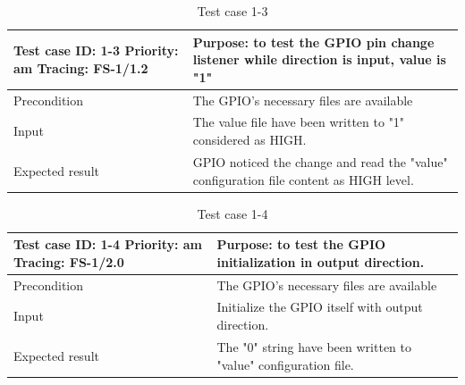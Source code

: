 \begin{table}[H]
	\caption{Test case 1-3}
	\label{table:TCase-FS1-3}
	\begin{center}
		\renewcommand{\arraystretch}{1.8}
		\begin{tabu} 
			to 0.9 \textwidth
			{  X[0.4, c] X[c] }
			\toprule
			Test case ID: 1-3 \newline Priority: am \newline Tracing: FS-1/1.2 & Purpose: to test the GPIO pin change listener while direction is input, value is "1"   \\ \midrule
			Precondition                                                       & The GPIO's necessary files are available                                               \\
			Input                                                              & The value file have been written to "1" considered as HIGH.                            \\
			Expected result                                                    & GPIO noticed the change and read the "value" configuration file content as HIGH level. \\ \bottomrule
		\end{tabu}
	\end{center}
\end{table} 

\begin{table}[H]
	\caption{Test case 1-4}
	\label{table:TCase-FS1-4}
	\begin{center}
		\renewcommand{\arraystretch}{1.8}
		\begin{tabu} 
			to 0.9 \textwidth
			{  X[0.4, c] X[c] }
			\toprule
			Test case ID: 1-4 \newline Priority: am \newline Tracing: FS-1/2.0 & Purpose: to test the GPIO initialization in output direction.   \\ \midrule
			Precondition                                                       & The GPIO's necessary files are available                        \\
			Input                                                              & Initialize the GPIO itself with output direction.               \\
			Expected result                                                    & The "0" string have been written to "value" configuration file. \\ \bottomrule
		\end{tabu}
	\end{center}
\end{table} 


